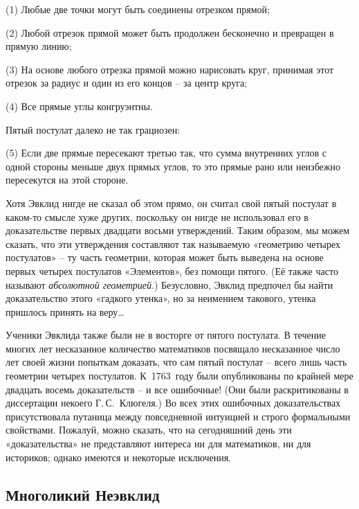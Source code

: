 \documentclass[../main.tex]{subfiles}
\begin{document}
(1) Любые две точки могут быть соединены отрезком прямой;

(2) Любой отрезок прямой может быть продолжен бесконечно и превращен в прямую линию;

(3) На основе любого отрезка прямой можно нарисовать круг, принимая этот отрезок за радиус и один из его концов \--- за центр круга;

(4) Все прямые углы конгруэнтны.

Пятый постулат далеко не так грациозен:

(5) Если две прямые пересекают третью так, что сумма внутренних углов с одной стороны меньше двух прямых углов, то это прямые рано или неизбежно пересекутся на этой стороне.

Хотя Эвклид нигде не сказал об этом прямо, он считал свой пятый постулат в каком-то смысле хуже других, поскольку он нигде не использовал его в доказательстве первых двадцати восьми утверждений. Таким образом, мы можем сказать, что эти утверждения составляют так называемую «геометрию четырех постулатов» \--- ту часть геометрии, которая может быть выведена на основе первых четырех постулатов «Элементов», без помощи пятого. (Её также часто называют \emph{абсолютной геометрией}.) Безусловно, Эвклид предпочел бы найти доказательство этого «гадкого утенка», но за неимением такового, утенка пришлось принять на веру\ldots{}

Ученики Эвклида также были не в восторге от пятого постулата. В течение многих лет несказанное количество математиков посвящало несказанное число лет своей жизни попыткам доказать, что сам пятый постулат \--- всего лишь часть геометрии четырех постулатов. К~1763~году были опубликованы по крайней мере двадцать восемь доказательств \--- и все ошибочные! (Они были раскритикованы в диссертации некоего Г.\,С.~Клюгеля.) Во всех этих ошибочных доказательствах присутствовала путаница между повседневной интуицией и строго формальными свойствами. Пожалуй, можно сказать, что на сегодняшний день эти «доказательства» не представляют интереса ни для математиков, ни для историков; однако имеются и некоторые исключения.


\subsection{Многоликий Неэвклид}
\end{document}
